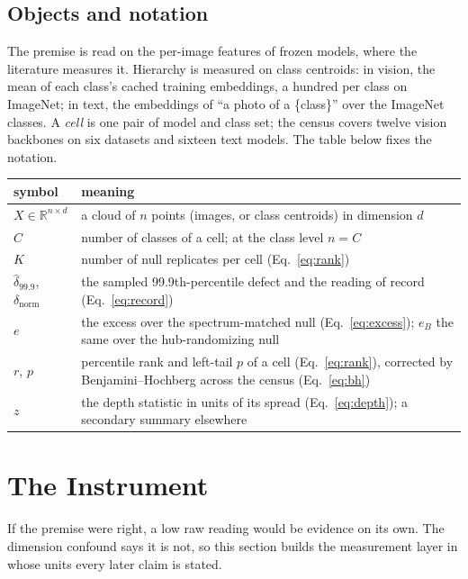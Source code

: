 \documentclass{article}
\theoremstyle{definition}
\begin{document}
\subsection{Objects and notation}
\label{sec:v2-objects}

The premise is read on the per-image features of frozen models, where the literature measures it. Hierarchy is measured on class centroids: in vision, the mean of each class's cached training embeddings, a hundred per class on ImageNet; in text, the embeddings of ``a photo of a \{class\}'' over the ImageNet classes. A \emph{cell} is one pair of model and class set; the census covers twelve vision backbones on six datasets and sixteen text models. The table below fixes the notation.
\begin{center}
\footnotesize
\begin{tabular}{l>{\raggedright\arraybackslash}p{10.6cm}}
\toprule
symbol & meaning \\
\midrule
$X\in\mathbb{R}^{n\times d}$ & a cloud of $n$ points (images, or class centroids) in dimension $d$ \\
$C$ & number of classes of a cell; at the class level $n=C$ \\
$K$ & number of null replicates per cell (Eq.~\ref{eq:rank}) \\
$\hat\delta_{99.9}$, $\delta_{\text{norm}}$ & the sampled 99.9th-percentile defect and the reading of record (Eq.~\ref{eq:record}) \\
$e$ & the excess over the spectrum-matched null (Eq.~\ref{eq:excess}); $e_B$ the same over the hub-randomizing null \\
$r$, $p$ & percentile rank and left-tail $p$ of a cell (Eq.~\ref{eq:rank}), corrected by Benjamini--Hochberg across the census (Eq.~\ref{eq:bh}) \\
$z$ & the depth statistic in units of its spread (Eq.~\ref{eq:depth}); a secondary summary elsewhere \\
\bottomrule
\end{tabular}
\end{center}

\section{The Instrument}
\label{sec:instrument}

If the premise were right, a low raw reading would be evidence on its own. The dimension confound says it is not, so this section builds the measurement layer in whose units every later claim is stated.
\end{document}
